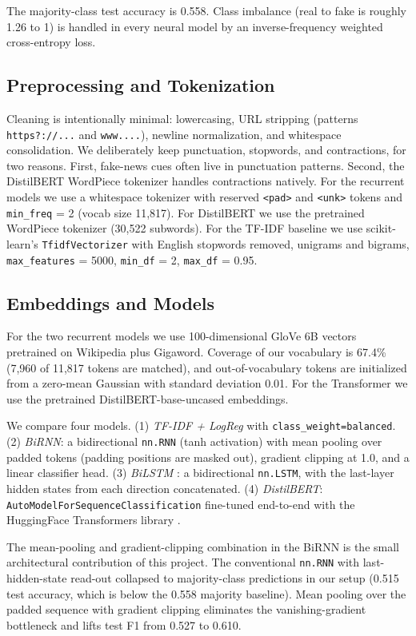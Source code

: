 \documentclass{article}
\begin{document}
The majority-class test accuracy is 0.558. Class imbalance (real to fake is roughly 1.26 to 1) is handled in every neural model by an inverse-frequency weighted cross-entropy loss.

\subsection{Preprocessing and Tokenization}
Cleaning is intentionally minimal: lowercasing, URL stripping (patterns \texttt{https?://...} and \texttt{www....}), newline normalization, and whitespace consolidation. We deliberately keep punctuation, stopwords, and contractions, for two reasons. First, fake-news cues often live in punctuation patterns. Second, the DistilBERT WordPiece tokenizer handles contractions natively. For the recurrent models we use a whitespace tokenizer with reserved \texttt{<pad>} and \texttt{<unk>} tokens and \texttt{min\_freq} = 2 (vocab size 11,817). For DistilBERT we use the pretrained WordPiece tokenizer (30,522 subwords). For the TF-IDF baseline we use scikit-learn's \texttt{TfidfVectorizer} with English stopwords removed, unigrams and bigrams, \texttt{max\_features} = 5000, \texttt{min\_df} = 2, \texttt{max\_df} = 0.95.

\subsection{Embeddings and Models}
For the two recurrent models we use 100-dimensional GloVe 6B vectors \citep{pennington2014glove} pretrained on Wikipedia plus Gigaword. Coverage of our vocabulary is 67.4\% (7,960 of 11,817 tokens are matched), and out-of-vocabulary tokens are initialized from a zero-mean Gaussian with standard deviation 0.01. For the Transformer we use the pretrained DistilBERT-base-uncased \citep{sanh2019distilbert} embeddings.

We compare four models. (1) \emph{TF-IDF + LogReg} with \texttt{class\_weight=balanced}. (2) \emph{BiRNN}: a bidirectional \texttt{nn.RNN} (tanh activation) with mean pooling over padded tokens (padding positions are masked out), gradient clipping at 1.0, and a linear classifier head. (3) \emph{BiLSTM} \citep{hochreiter1997lstm}: a bidirectional \texttt{nn.LSTM}, with the last-layer hidden states from each direction concatenated. (4) \emph{DistilBERT}: \texttt{AutoModelForSequenceClassification} fine-tuned end-to-end with the HuggingFace Transformers library \citep{wolf2020transformers}.

The mean-pooling and gradient-clipping combination in the BiRNN is the small architectural contribution of this project. The conventional \texttt{nn.RNN} with last-hidden-state read-out collapsed to majority-class predictions in our setup (0.515 test accuracy, which is below the 0.558 majority baseline). Mean pooling over the padded sequence with gradient clipping eliminates the vanishing-gradient bottleneck and lifts test F1 from 0.527 to 0.610.
\end{document}
